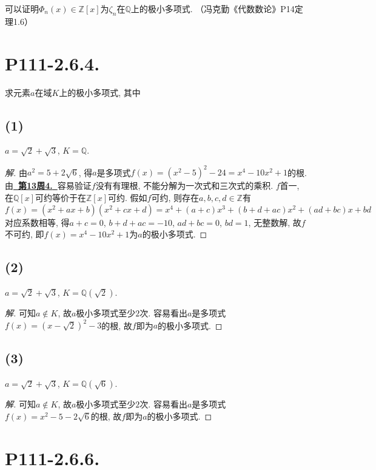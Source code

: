 \documentclass[12pt, a4paper, fontset=windows]{ctexart}
\newcommand{\Q}{\mathbb{Q}}
\newcommand{\Z}{\mathbb{Z}}
\newcommand{\kh}[1]{（{#1}）} %
\newcommand{\myref}[2][]{\hyperref[#1]{\bf\color{blue}\ {#2}\ }}
\newenvironment{solution}{\begin{proof}[解]}{\end{proof}}
\begin{document}
可以证明$\Phi_n(x)\in\Z[x]$为$\zeta_n$在$\Q$上的极小多项式. 
\cite{fkqdssl}\kh{冯克勤《代数数论》P14定理1.6}

\section*{P111-2.6.4.}

求元素$a$在域$K$上的极小多项式, 其中

\subsection*{(1)}

$a=\sqrt2+\sqrt3$, $K=\Q$. 

\begin{solution}
由$a^2=5+2\sqrt{6}$, 得$a$是多项式$f(x)=(x^2-5)^2-24=x^4-10x^2+1$的根. 
由\myref[Q-root]{第13周4.}容易验证$f$没有有理根, 不能分解为一次式和三次式的乘积. 
$f$首一, 在$\Q[x]$可约等价于在$\Z[x]$可约. 假如$f$可约, 
则存在$a,b,c,d\in\Z$有
\[f(x)=(x^2+ax+b)(x^2+cx+d)=x^4+(a+c)x^3+(b+d+ac)x^2+(ad+bc)x+bd\]
对应系数相等, 得$a+c=0$, $b+d+ac=-10$, $ad+bc=0$, $bd=1$, 
无整数解, 故$f$不可约, 即$f(x)=x^4-10x^2+1$为$a$的极小多项式. 
\end{solution}

\subsection*{(2)}

$a=\sqrt2+\sqrt3$, $K=\Q(\sqrt2)$. 

\begin{solution}
可知$a\notin K$, 故$a$极小多项式至少$2$次. 
容易看出$a$是多项式$f(x)=(x-\sqrt{2})^2-3$的根, 
故$f$即为$a$的极小多项式. 
\end{solution}

\subsection*{(3)}

$a=\sqrt2+\sqrt3$, $K=\Q(\sqrt6)$. 

\begin{solution}
可知$a\notin K$, 故$a$极小多项式至少$2$次. 
容易看出$a$是多项式$f(x)=x^2-5-2\sqrt{6}$的根, 
故$f$即为$a$的极小多项式. 
\end{solution}

\section*{P111-2.6.6.}
\end{document}

